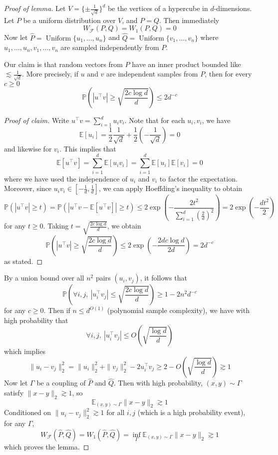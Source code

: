 \documentclass[11pt]{article}
\renewcommand{\P}{\mathbb{P}}
\newcommand{\E}{\mathbb{E}}
\newcommand{\cF}{\mathcal{F}}
\newcommand{\WF}{W_{\cF}}
\newcommand{\T}{^{\!\top\!}}
\newcommand{\GT}[1]{\textcolor{red}{Garrett: #1}}
\begin{document}
\begin{proof}[Proof of lemma]
Let $V = \{\pm \frac{1}{\sqrt{d}}\}^d$ be the vertices of a hypercube in $d$-dimensions.
Let $P$ be a uniform distribution over $V$, and $P = Q$.
Then immediately
\[\WF(P,Q) = W_1(P,Q) = 0\]
Now let $\hat{P} = \operatorname{Uniform}\{u_1, \dots, u_n\}$ and $\hat{Q} = \operatorname{Uniform}\{v_1, \dots, v_n\}$ where $u_1, \dots, u_n, v_1, \dots, v_n$ are sampled independently from $P$.

Our claim is that random vectors from $P$ have an inner product bounded like $\lesssim \frac{1}{\sqrt{d}}$.
More precisely, if $u$ and $v$ are independent samples from $P$, then for every $c \ge 0$
\[\P\left(|u\T v| \ge \sqrt{\frac{2c\log d}{d}}\right) \le 2d^{-c}\]
\begin{proof}[Proof of claim]
Write $u\T v = \sum_{i=1}^d u_iv_i$.
Note that for each $u_i, v_i$, we have
\[\E[u_i] = \frac{1}{2}\frac{1}{\sqrt{d}} + \frac{1}{2}\left(-\frac{1}{\sqrt{d}}\right) = 0\]
and likewise for $v_i$.
This implies that
\[\E[u\T v] = \sum_{i=1}^d \E[u_iv_i] = \sum_{i=1}^d \E[u_i]\E[v_i] = 0\]
where we have used the independence of $u_i$ and $v_i$ to factor the expectation.
Moreover, since $u_iv_i \in [-\frac{1}{d}, \frac{1}{d}]$, we can apply Hoeffding's inequality to obtain
\[\P(|u\T v| \ge t) = \P(|u\T v - \E[u\T v]| \ge t) \le 2\exp\left(-\frac{2t^2}{\sum_{i=1}^d \left(\frac{2}{d}\right)^2}\right) = 2\exp\left(-\frac{dt^2}{2}\right)\]
for any $t \ge 0$.
Taking $t = \sqrt{\frac{2c\log d}{d}}$, we obtain
\[\P\left(|u\T v| \ge \sqrt{\frac{2c\log d}{d}}\right) \le 2\exp\left(-\frac{2dc\log d}{2d}\right) = 2d^{-c}\]
as stated.
\end{proof}
By a union bound over all $n^2$ pairs $(u_i, v_j)$, it follows that
\[\P\left(\forall i,j, ~ |u_i\T v_j| \le \sqrt{\frac{2c\log d}{d}}\right) \ge 1 - 2n^2d^{-c}\]
for any $c \ge 0$.  Then if $n \le d^{O(1)}$ (polynomial sample
complexity), we have with high probability that
\[\forall i,j, ~ |u_i\T v_j| \le O\left(\sqrt{\frac{\log d}{d}}\right)\]
which implies
\[\|u_i-v_j\|_2^2 = \|u_i\|_2^2 + \|v_j\|_2^2 - 2u_i\T v_j \ge 2 - O\left(\sqrt{\frac{\log d}{d}}\right) \gtrsim 1\]
Now let $\Gamma$ be a coupling of $\hat{P}$ and $\hat{Q}$.
Then with high probability, $(x,y) \sim \Gamma$ satisfy $\|x-y\|_2 \gtrsim 1$, so
\[\E_{(x,y) \sim \Gamma} \|x-y\|_2 \gtrsim 1\]
Conditioned on $\|u_i - v_j\|_2^2 \gtrsim 1$ for all $i, j$ (which is a high probability event), for any $\Gamma$,
\[\WF(\hat{P}, \hat{Q}) = W_1(\hat{P}, \hat{Q}) = \inf_\Gamma \E_{(x,y) \sim \Gamma} \|x-y\|_2 \gtrsim 1\]
which proves the lemma.
\end{proof}
\end{document}

